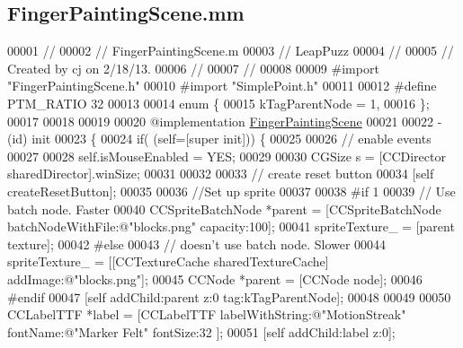 \hypertarget{_finger_painting_scene_8mm}{\subsection{Finger\-Painting\-Scene.\-mm}
\label{d4/dd7/_finger_painting_scene_8mm}
}

\begin{DoxyCode}
00001 \textcolor{comment}{//}
00002 \textcolor{comment}{//  FingerPaintingScene.m}
00003 \textcolor{comment}{//  LeapPuzz}
00004 \textcolor{comment}{//}
00005 \textcolor{comment}{//  Created by cj on 2/18/13.}
00006 \textcolor{comment}{//}
00007 \textcolor{comment}{//}
00008 
00009 \textcolor{preprocessor}{#import "FingerPaintingScene.h"}
00010 \textcolor{preprocessor}{#import "SimplePoint.h"}
00011 
00012 \textcolor{preprocessor}{#define PTM\_RATIO 32}
00013 \textcolor{preprocessor}{}
00014 \textcolor{keyword}{enum} \{
00015     kTagParentNode = 1,
00016 \};
00017 
00018 
00019 
00020 \textcolor{keyword}{@implementation }\hyperlink{interface_finger_painting_scene}{FingerPaintingScene}
00021 
00022 -(id) init
00023 \{
00024     \textcolor{keywordflow}{if}( (\textcolor{keyword}{self}=[super init])) \{
00025         
00026         \textcolor{comment}{// enable events}
00027 
00028         \textcolor{keyword}{self}.isMouseEnabled = YES;
00029 
00030         CGSize s = [CCDirector sharedDirector].winSize;
00031         
00032         
00033         \textcolor{comment}{// create reset button}
00034         [\textcolor{keyword}{self} createResetButton];
00035         
00036         \textcolor{comment}{//Set up sprite}
00037         
00038 \textcolor{preprocessor}{#if 1}
00039 \textcolor{preprocessor}{}        \textcolor{comment}{// Use batch node. Faster}
00040         CCSpriteBatchNode *parent = [CCSpriteBatchNode batchNodeWithFile:@"blocks.png" capacity:100];
00041         spriteTexture\_ = [parent texture];
00042 \textcolor{preprocessor}{#else}
00043 \textcolor{preprocessor}{}        \textcolor{comment}{// doesn't use batch node. Slower}
00044         spriteTexture\_ = [[CCTextureCache sharedTextureCache] addImage:@"blocks.png"];
00045         CCNode *parent = [CCNode node];
00046 \textcolor{preprocessor}{#endif}
00047 \textcolor{preprocessor}{}        [\textcolor{keyword}{self} addChild:parent z:0 tag:kTagParentNode];
00048         
00049                 
00050         CCLabelTTF *label = [CCLabelTTF labelWithString:@"MotionStreak" fontName:@"Marker Felt" fontSize:32
      ];
00051         [\textcolor{keyword}{self} addChild:label z:0];

\end{DoxyCode}
